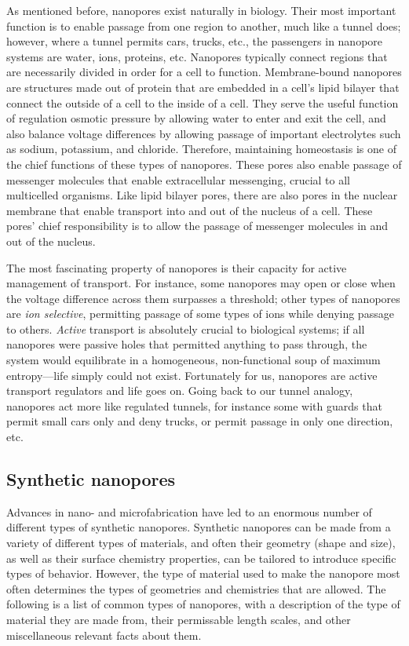			As mentioned before, nanopores exist naturally in biology. Their most important function is to enable passage from one region to another, much like a tunnel does; however, where a tunnel permits cars, trucks, etc., the passengers in nanopore systems are water, ions, proteins, etc. Nanopores typically connect regions that are necessarily divided in order for a cell to function. Membrane-bound nanopores are structures made out of protein that are embedded in a cell's lipid bilayer that connect the outside of a cell to the inside of a cell. They serve the useful function of regulation osmotic pressure by allowing water to enter and exit the cell, and also balance voltage differences by allowing passage of important electrolytes such as sodium, potassium, and chloride. Therefore, maintaining homeostasis is one of the chief functions of these types of nanopores. These pores also enable passage of messenger molecules that enable extracellular messenging, crucial to all multicelled organisms. Like lipid bilayer pores, there are also pores in the nuclear membrane that enable transport into and out of the nucleus of a cell. These pores' chief responsibility is to allow the passage of messenger molecules in and out of the nucleus. 

			The most fascinating property of nanopores is their capacity for active management of transport. For instance, some nanopores may open or close when the voltage difference across them surpasses a threshold; other types of nanopores are \textit{ion selective}, permitting passage of some types of ions while denying passage to others. \textit{Active} transport is absolutely crucial to biological systems; if all nanopores were passive holes that permitted anything to pass through, the system would equilibrate in a homogeneous, non-functional soup of maximum entropy---life simply could not exist. Fortunately for us, nanopores are active transport regulators and life goes on. Going back to our tunnel analogy, nanopores act more like regulated tunnels, for instance some with guards that permit small cars only and deny trucks, or permit passage in only one direction, etc.

		\subsection{Synthetic nanopores}

			Advances in nano- and microfabrication have led to an enormous number of different types of synthetic nanopores. Synthetic nanopores can be made from a variety of different types of materials, and often their geometry (shape and size), as well as their surface chemistry properties, can be tailored to introduce specific types of behavior. However, the type of material used to make the nanopore most often determines the types of geometries and chemistries that are allowed. The following is a list of common types of nanopores, with a description of the type of material they are made from, their permissable length scales, and other miscellaneous relevant facts about them.

